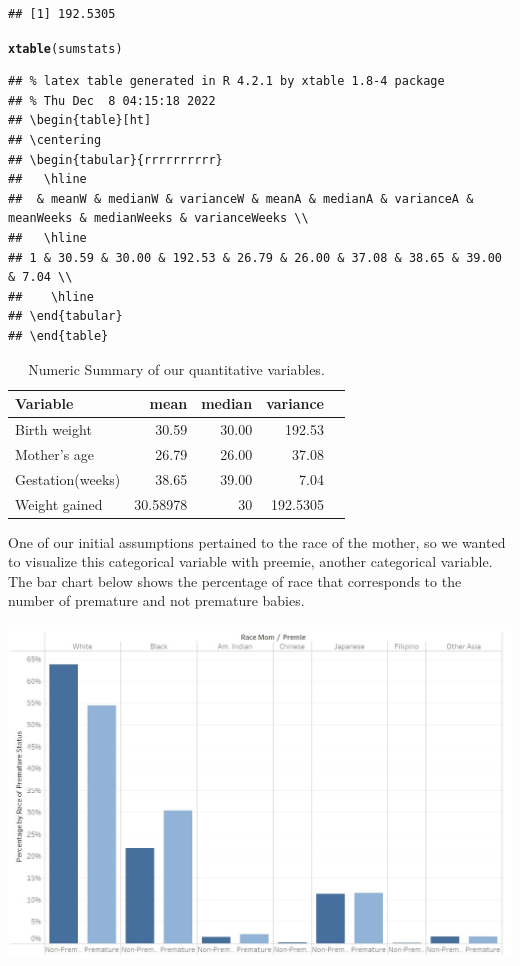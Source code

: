 \documentclass{article}\usepackage[]{graphicx}\usepackage[]{xcolor}
\makeatletter
\newcommand{\hlstd}[1]{\textcolor[rgb]{0.345,0.345,0.345}{#1}}%
\newcommand{\hlkwd}[1]{\textcolor[rgb]{0.737,0.353,0.396}{\textbf{#1}}}%
\newenvironment{kframe}{%
 \def\at@end@of@kframe{}%
 \ifinner\ifhmode%
  \def\at@end@of@kframe{\end{minipage}}%
  \begin{minipage}{\columnwidth}%
 \fi\fi%
 \def\FrameCommand##1{\hskip\@totalleftmargin \hskip-\fboxsep
 \colorbox{shadecolor}{##1}\hskip-\fboxsep
     \hskip-\linewidth \hskip-\@totalleftmargin \hskip\columnwidth}%
 \MakeFramed {\advance\hsize-\width
   \@totalleftmargin\z@ \linewidth\hsize
   \@setminipage}}%
 {\par\unskip\endMakeFramed%
 \at@end@of@kframe}
\newenvironment{knitrout}{}{} %
\makeatother
\begin{document}
\begin{enumerate}[a.]
\begin{knitrout}
\begin{kframe}
\begin{verbatim}
## [1] 192.5305
\end{verbatim}
\begin{alltt}
\hlkwd{xtable}\hlstd{(sumstats)}
\end{alltt}
\begin{verbatim}
## % latex table generated in R 4.2.1 by xtable 1.8-4 package
## % Thu Dec  8 04:15:18 2022
## \begin{table}[ht]
## \centering
## \begin{tabular}{rrrrrrrrrr}
##   \hline
##  & meanW & medianW & varianceW & meanA & medianA & varianceA & meanWeeks & medianWeeks & varianceWeeks \\ 
##   \hline
## 1 & 30.59 & 30.00 & 192.53 & 26.79 & 26.00 & 37.08 & 38.65 & 39.00 & 7.04 \\ 
##    \hline
## \end{tabular}
## \end{table}
\end{verbatim}
\end{kframe}
\end{knitrout}

\begin{table}[H]
\centering
\begin{tabular}{lrrrr}
  \hline
  Variable & mean & median & variance \\ 
  \hline
  Birth weight & 30.59 & 30.00 & 192.53\\
  Mother's age & 26.79 & 26.00 & 37.08 \\
  Gestation(weeks) & 38.65 & 39.00 & 7.04 \\ 
  Weight gained & 30.58978 & 30 & 192.5305 \\
  \hline
\end{tabular}
\caption{Numeric Summary of our quantitative variables.}
\end{table}

One of our initial assumptions pertained to the race of the mother, so we wanted to visualize this categorical variable with preemie, another categorical variable. The bar chart below shows the percentage of race that corresponds to the number of premature and not premature babies. 

\includegraphics{./RacePremiePercent.jpg}


\end{enumerate}
\end{document}
